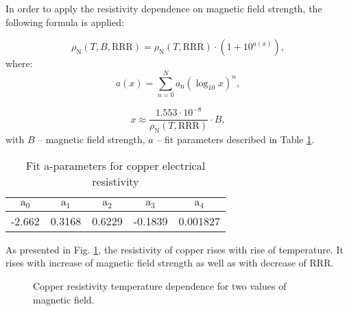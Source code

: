 In order to apply the resistivity dependence on magnetic field strength, the following formula is applied:

\begin{equation}
    \rho_\text{N}(T, B, \text{RRR}) = \rho_\text{N}(T, \text{RRR}) \cdot (1 + 10^{a(x)}),  
\end{equation}
where:
\begin{equation}
    a(x) = \sum_{n=0}^{N} a_\text{n}(\log_\text{10}x)^{n},
\end{equation}

\begin{equation}
    x \approx \frac{1.553 \cdot 10^{-8}}{\rho_\text{N}(T, \text{RRR})} \cdot B,
\end{equation}
with $B$ -- magnetic field strength, $a$ -- fit parameters described in Table \ref{table:nist_resistivity_parameters2}.

\begin{table}[h!]
    \caption{Fit a-parameters for copper electrical resistivity} 
    \vspace{-1.em} 
    \fontsize{10}{10}
    \selectfont 
    \renewcommand{\arraystretch}{1.5}
    \begin{center}
    \begin{tabular}{ ccccc }  
    $\text{a}_0$ & $\text{a}_1$ & $\text{a}_2$ & $\text{a}_3$ & $\text{a}_4$ \\
    \hline
    -2.662 & 0.3168 & 0.6229 & -0.1839 & 0.001827 \\
    \hline
    \end{tabular}
    \end{center}  
     \label{table:nist_resistivity_parameters2} 
 \end{table}

As presented in Fig. \ref{fig:cu_resistivity_plot}, the resistivity of copper rises with rise of temperature. It rises with increase of magnetic field strength as well as with decrease of RRR.

\begin{figure}[H]
\centering
{}
\caption{Copper resistivity temperature dependence for two values of magnetic field.}
    \label{fig:cu_resistivity_plot}
\end{figure}


